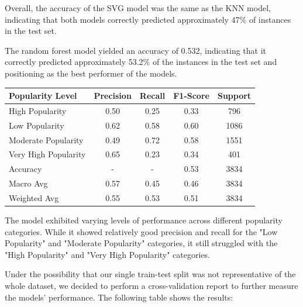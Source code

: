 \documentclass[11pt]{article} %
\begin{document}
Overall, the accuracy of the SVG model was the same as the KNN model, indicating that both models correctly predicted approximately 47\% of instances in the test set.



The random forest model yielded an accuracy of 0.532, indicating that it correctly predicted approximately 53.2\% of the instances in the test set and positioning as the best performer of the models.

\begin{table}[H]
	\centering
	\begin{tabular}{lcccc}
		\toprule
		\textbf{Popularity Level} & \textbf{Precision} & \textbf{Recall} & \textbf{F1-Score} & \textbf{Support} \\
		\midrule
		\hline
		High Popularity           & 0.50               & 0.25            & 0.33              & 796              \\
		Low Popularity            & 0.62               & 0.58            & 0.60              & 1086             \\
		Moderate Popularity       & 0.49               & 0.72            & 0.58              & 1551             \\
		Very High Popularity      & 0.65               & 0.23            & 0.34              & 401              \\
		\hline
		Accuracy                  & -                  & -               & 0.53              & 3834             \\
		Macro Avg                 & 0.57               & 0.45            & 0.46              & 3834             \\
		Weighted Avg              & 0.55               & 0.53            & 0.51              & 3834             \\
		\bottomrule
	\end{tabular}
\end{table}

The model exhibited varying levels of performance across different popularity categories. While it showed relatively good precision and recall for the "Low Popularity" and "Moderate Popularity" categories, it still struggled with the "High Popularity" and "Very High Popularity" categories.

Under the possibility that our single train-test split was not representative of the whole dataset, we decided to perform a cross-validation report to further measure the models' performance. The following table shows the results:
\end{document}

